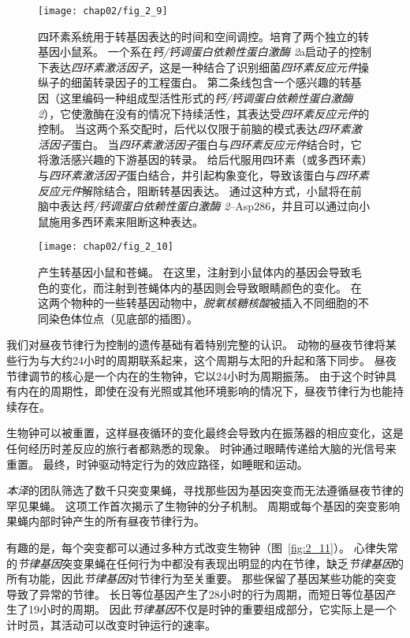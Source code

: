 \begin{figure}[htbp]
	\centering
	\texttt{[image: chap02/fig\_2\_9]}
	\caption{四环素系统用于转基因表达的时间和空间调控。培育了两个独立的转基因小鼠系。
		一个系在\textit{钙/钙调蛋白依赖性蛋白激酶 2}a启动子的控制下表达\textit{四环素激活因子}，这是一种结合了识别细菌\textit{四环素反应元件}操纵子的细菌转录因子的工程蛋白。
		第二条线包含一个感兴趣的转基因（这里编码一种组成型活性形式的\textit{钙/钙调蛋白依赖性蛋白激酶 2}），它使激酶在没有的情况下持续活性，其表达受\textit{四环素反应元件}的控制。
		当这两个系交配时，后代以仅限于前脑的模式表达\textit{四环素激活因子}蛋白。
		当\textit{四环素激活因子}蛋白与\textit{四环素反应元件}结合时，它将激活感兴趣的下游基因的转录。
		给后代服用四环素（或多西环素）与\textit{四环素激活因子}蛋白结合，并引起构象变化，导致该蛋白与\textit{四环素反应元件}解除结合，阻断转基因表达。
		通过这种方式，小鼠将在前脑中表达\textit{钙/钙调蛋白依赖性蛋白激酶 2}–Asp286，并且可以通过向小鼠施用多西环素来阻断这种表达\cite{mayford1996control}。}
	\label{fig:2_9}
\end{figure}


\begin{figure}[htbp]
	\centering
	\texttt{[image: chap02/fig\_2\_10]}
	\caption{产生转基因小鼠和苍蝇。
		在这里，注射到小鼠体内的基因会导致毛色的变化，而注射到苍蝇体内的基因则会导致眼睛颜色的变化。
		在这两个物种的一些转基因动物中，\textit{脱氧核糖核酸}被插入不同细胞的不同染色体位点（见底部的插图）\cite{alberts2017molecular}。}
	\label{fig:2_10}
\end{figure}




我们对昼夜节律行为控制的遗传基础有着特别完整的认识。
动物的昼夜节律将某些行为与大约24小时的周期联系起来，这个周期与太阳的升起和落下同步。
昼夜节律调节的核心是一个内在的生物钟，它以24小时为周期振荡。
由于这个时钟具有内在的周期性，即使在没有光照或其他环境影响的情况下，昼夜节律行为也能持续存在。



生物钟可以被重置，这样昼夜循环的变化最终会导致内在振荡器的相应变化，这是任何经历时差反应的旅行者都熟悉的现象。
时钟通过眼睛传递给大脑的光信号来重置。
最终，时钟驱动特定行为的效应路径，如睡眠和运动。


\textit{本泽}的团队筛选了数千只突变果蝇，寻找那些因为基因突变而无法遵循昼夜节律的罕见果蝇。
这项工作首次揭示了生物钟的分子机制。
周期或每个基因的突变影响果蝇内部时钟产生的所有昼夜节律行为。


有趣的是，每个突变都可以通过多种方式改变生物钟（图~\ref{fig:2_11}）。
心律失常的\textit{节律基因}突变果蝇在任何行为中都没有表现出明显的内在节律，缺乏\textit{节律基因}的所有功能，因此\textit{节律基因}对节律行为至关重要。
那些保留了基因某些功能的突变导致了异常的节律。
长日等位基因产生了28小时的行为周期，而短日等位基因产生了19小时的周期。
因此\textit{节律基因}不仅是时钟的重要组成部分，它实际上是一个计时员，其活动可以改变时钟运行的速率。


